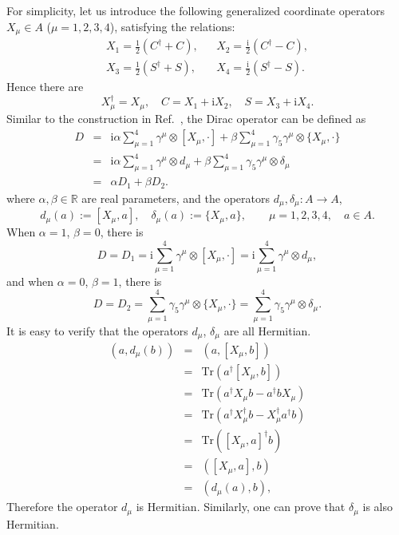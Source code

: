 \documentclass[a4paper,11pt]{article}
\begin{document}
For simplicity, let us introduce the following generalized coordinate operators $X_{\mu} \in
A$ ($\mu = 1, 2, 3, 4$), satisfying the relations:
\begin{eqnarray}
  X_1 = \frac{1}{2}  (C^{\dag} + C), && X_2 = \frac{\mathrm{i}}{2} (C^{\dag} - C),
\nonumber\\
  X_3 = \frac{1}{2}  (S^{\dag} + S), && X_4 = \frac{\mathrm{i}}{2} (S^{\dag} - S) .
\end{eqnarray}
Hence there are
\begin{equation}
  X_{\mu}^{\dag} = X_{\mu}, \quad C = X_1 + \mathrm{i}X_2, \quad
  S = X_3 + \mathrm{i}X_4 .
\end{equation}
Similar to the construction in Ref.~\cite{Bigatti1}, the Dirac operator can be
defined as
\begin{eqnarray}
  D & = & \mathrm{i} \alpha \sum_{\mu = 1}^4 \gamma^{\mu} \otimes [X_{\mu},
    \cdot  ] + \beta \sum_{\mu = 1}^4 \gamma_5
  \gamma^{\mu} \otimes \{X_{\mu},   \cdot   \}
  \nonumber\\
  & = & \mathrm{i} \alpha \sum_{\mu = 1}^4 \gamma^{\mu} \otimes d_{\mu} + \beta
  \sum_{\mu = 1}^4 \gamma_5 \gamma^{\mu} \otimes \delta_{\mu} \nonumber\\
  & = & \alpha D_1 + \beta D_2 . 
\end{eqnarray}
where $\alpha, \beta \in \mathbb{R}$ are real parameters, and the operators $d_{\mu},\delta_{\mu}: A \rightarrow A$,
\begin{equation}
  d_{\mu} (a) := [X_{\mu}, a], \quad \delta_{\mu} (a) := \{X_{\mu}, a\},
  \qquad \mu = 1, 2, 3, 4, \quad a \in A.
\end{equation}
When $\alpha=1$, $\beta=0$, there is
\begin{equation}
  D=D_1 = \mathrm{i} \sum_{\mu = 1}^4 \gamma^{\mu} \otimes [X_{\mu},  
  \cdot  ] = \mathrm{i} \sum_{\mu = 1}^4 \gamma^{\mu} \otimes d_{\mu},
\end{equation}
and when $\alpha=0$, $\beta=1$, there is
\begin{equation}
  D=D_2 = \sum_{\mu = 1}^4 \gamma_5 \gamma^{\mu} \otimes \{X_{\mu},
    \cdot   \} = \sum_{\mu = 1}^4 \gamma_5
  \gamma^{\mu} \otimes \delta_{\mu} .
\end{equation}
It is easy to verify that the operators $d_{\mu}$, $\delta_{\mu}$ are all
Hermitian.
\begin{eqnarray}
  (a, d_{\mu} (b)) & = & (a, [X_{\mu}, b]) \nonumber\\
  & = & \mathrm{Tr} (a^{\dag} [X_{\mu}, b]) \nonumber\\
  & = & \mathrm{Tr} (a^{\dag} X_{\mu} b - a^{\dag} bX_{\mu}) \nonumber\\
  & = & \mathrm{Tr} (a^{\dag} X_{\mu}^{\dag} b - X_{\mu}^{\dag} a^{\dag} b)
  \nonumber\\
  & = & \mathrm{Tr} ([X_{\mu}, a]^{\dag} b) \nonumber\\
  & = & ([X_{\mu}, a], b) \nonumber\\
  & = & (d_{\mu} (a), b), 
\end{eqnarray}
Therefore the operator $d_{\mu}$ is Hermitian. Similarly, one can prove that
$\delta_{\mu}$ is also Hermitian.
\end{document}
